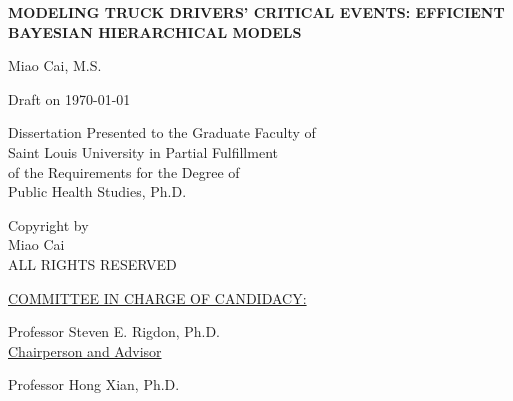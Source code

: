 \documentclass[12pt]{book}
\numberwithin{equation}{chapter}
\newenvironment{bottompar}{\par\vspace*{\fill}}{\clearpage}%
\begin{document}
\begin{titlepage}
\vspace{1cm}
\begin{center}
\linespread{2}\normalsize \bfseries \MakeUppercase{Modeling Truck Drivers' Critical Events: Efficient Bayesian Hierarchical Models}
\end{center}

\vspace{7cm}

\begin{center}
{Miao Cai,  M.S.}
\vspace{0.3cm}

Draft on \today

\vspace{9cm}

Dissertation Presented to the Graduate Faculty of \\
Saint Louis University in Partial Fulfillment \\
of the Requirements for the Degree of\\
Public Health Studies, Ph.D.\\
\vspace{.5cm}
\the\year
\end{center}

\end{titlepage}
\clearpage


\begin{bottompar}
\begin{center}
\textcopyright \xspace Copyright by\\
Miao Cai \\
ALL RIGHTS RESERVED\\
\vspace{.5cm}
\the\year
\end{center}
\end{bottompar}

\vspace*{\fill}
\underline{COMMITTEE IN CHARGE OF CANDIDACY:}

\vspace{.3cm}
Professor Steven E. Rigdon, Ph.D.\\
{\setlength{\parindent}{20ex}  \indent \underline{Chairperson and Advisor}}

\vspace{.3cm}
Professor Hong Xian, Ph.D.
\end{document}
